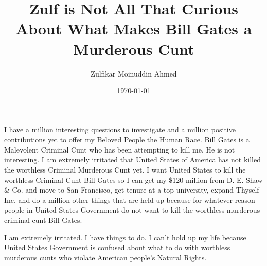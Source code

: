\documentclass{amsart}
\title{Zulf is Not All That Curious About What Makes Bill Gates a Murderous Cunt}
\author{Zulfikar Moinuddin Ahmed}
\date{\today}
\begin{document}
\maketitle

I have a million interesting questions to investigate and a million positive contributions yet to offer my Beloved People the Human Race.  Bill Gates is a Malevolent Criminal Cunt who has been attempting to kill me.  He is not interesting.  I am extremely irritated that United States of America has not killed the worthless Criminal Murderous Cunt yet.  I want United States to kill the worthless Criminal Cunt Bill Gates so I can get my \$120 million from D. E. Shaw \& Co. and move to San Francisco, get tenure at a top university, expand Thyself Inc. and do a million other things that are held up because for whatever reason people in United States Government do not want to kill the worthless murderous criminal cunt Bill Gates.

I am extremely irritated.  I have things to do.  I can't hold up my life because United States Government is confused about what to do with worthless murderous cunts who violate American people's Natural Rights.  
\end{document}
